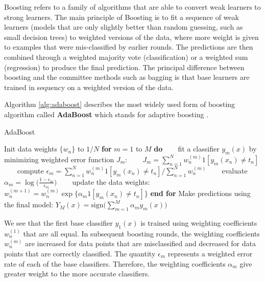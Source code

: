 Boosting refers to a family of algorithms that are able to convert weak learners to strong learners. The main principle of Boosting is to fit a sequence of weak learners (models that are only slightly better than random guessing, such as small decision trees) to weighted versions of the data, where more weight is given to examples that were mis-classified by earlier rounds. The predictions are then combined through a weighted majority vote (classification) or a weighted sum (regression) to produce the final prediction. The principal difference between boosting and the committee methods such as bagging is that base learners are trained in sequency on a weighted version of the data.   

Algorithm \ref{alg:adaboost} describes the most widely used form of boosting algorithm called \textbf{AdaBoost} which stands for adaptive boosting \cite{Freund97}. 

\begin{algorithm}
\caption{AdaBoost}
\label{alg:adaboost}
\begin{algorithmic}[1]
\STATE Init data weights $\{w_n\}$ to $1/N$ 
\STATE \textbf{for} $m = 1$ to $M$ \textbf{do}  
\STATE ~~~ fit a classifier $y_m(x)$ by minimizing weighted error function $J_m$:
\STATE ~~~ $J_m = \sum_{n=1}^{N} w_{n}^{(m)}1[y_m(x_n) \neq t_n]$
\STATE ~~~ compute $\epsilon_m = \sum_{n=1}^{N} w_{n}^{(m)}1[y_m(x_n) \neq t_n] / \sum_{n=1}^{N}w_{n}^{(m)}$
\STATE ~~~ evaluate $\alpha_m = \log \big(\frac{1-\epsilon_m}{\epsilon_m}\big)$
\STATE ~~~ update the data weights: $w_{n}^{(m+1)} = w_{n}^{(m)}\exp\{\alpha_m 1[y_m(x_n) \neq t_n]\}$
\STATE \textbf{end for}
\STATE Make predictions using the final model: $Y_M(x)=\mathrm{sign}\bigg(\sum_{m=1}^{M}\alpha_m y_m(x)\bigg)$ 
\end{algorithmic}
\end{algorithm}

We see that the first base classifier $y_1(x)$ is trained using weighting coefficients $w_{n}^{(1)}$ that are all equal. In subsequent boosting rounds, the weighting coefficients $w_{n}^{(m)}$ are increased for data points that are misclassified and decreased for data points that are correctly classified. The quantity $\epsilon_m$ represents a weighted error rate of each of the base classifiers. Therefore, the weighting coefficients $\alpha_m$ give greater weight to the more accurate classifiers.\\

